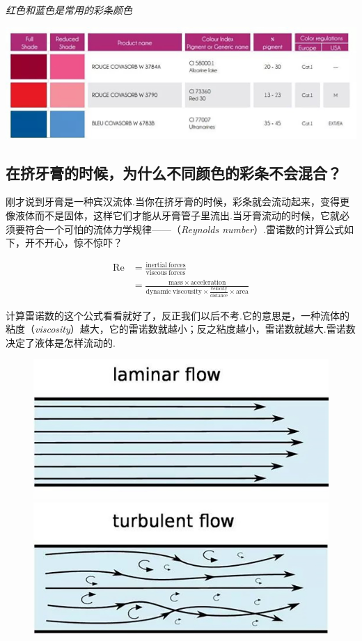 \begin{table}[h]
    \centering
    \caption{\textit{红色和蓝色是常用的彩条颜色}}
\includegraphics[width=0.9\linewidth]{Interstellar/IMG/201907/05.jpg}
    
    
\end{table}

\begin{multicols}{2}
\section*{在挤牙膏的时候，为什么不同颜色的彩条不会混合？}

刚才说到牙膏是一种宾汉流体.当你在挤牙膏的时候，彩条就会流动起来，变得更像液体而不是固体，这样它们才能从牙膏管子里流出.当牙膏流动的时候，它就必须要符合一个可怕的流体力学规律——（\textit{Reynolds number}\/）.雷诺数的计算公式如下，开不开心，惊不惊吓？

\[
\begin{split}
\mathrm{Re}&=\mathrm{\frac{inertial\ forces}{viscous\ forces}}\\
&=\mathrm{\frac{mass \times acceleration}{dynamic\ viscousity\times \frac{velocity}{distance}\times area}}
\end{split}
\]

计算雷诺数的这个公式看看就好了，反正我们以后不考.它的意思是，一种流体的粘度（\textit{viscosity}\/）越大，它的雷诺数就越小；反之粘度越小，雷诺数就越大.雷诺数决定了液体是怎样流动的.

\begin{figure}[H]
    \centering
    \includegraphics[width=0.5\linewidth]{Interstellar/IMG/201907/07.jpg}\\\includegraphics[width=0.5\linewidth]{Interstellar/IMG/201907/08.jpg}


\end{figure}
\end{multicols}
